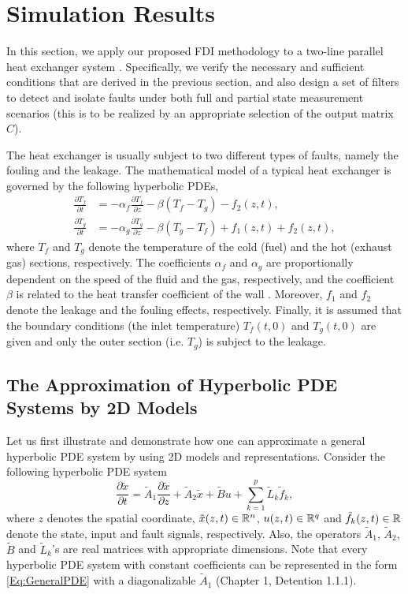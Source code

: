 \documentclass[journal,12pt,draftcls,onecolumn]{IEEEtran}
\newcommand{\pardiff}[2]{\frac{\partial {#1}}{\partial {#2}}}
\begin{document}
\section{Simulation Results}\label{Sec:Simulation}
In this section, we apply our proposed  FDI methodology to a two-line parallel heat exchanger system \cite{HyperPDE_2D,HEleakageThesis}. Specifically, we verify the necessary and sufficient conditions that are derived in the previous section, and also design a set of filters to detect and isolate  faults under both full and partial state measurement scenarios (this is to be realized by an appropriate selection of the output matrix $C$).

The heat exchanger is usually subject to two different types of faults, namely the fouling and the leakage\cite{HEleakageThesis}. 
The mathematical model of a typical heat exchanger is governed by the following hyperbolic PDEs,
\begin{equation}\label{Eq:HEfaulty}
\begin{split}
\frac{\partial T_f}{\partial t} &= -\alpha_f \frac{\partial T_f}{\partial z} - \beta(T_f - T_g) -  f_2(z,t),\\
\frac{\partial T_{g}}{\partial t} &= -\alpha_{g} \frac{\partial T_{g}}{\partial z} - \beta(T_{g} - T_f) +  f_1(z,t) +f_2(z,t),
\end{split}
\end{equation}
where $T_f$ and $T_g$ denote the temperature of the cold (fuel)  and the hot (exhaust gas) sections, respectively. The coefficients $\alpha_f$ and $\alpha_{g}$ are proportionally dependent on the speed of the fluid and the gas, respectively, and the coefficient $\beta$ is related to the heat transfer coefficient of the wall \cite{HEleakageThesis}. Moreover, $f_1$ and $f_2$ denote the leakage and the fouling effects, respectively. Finally, it is  assumed that the boundary conditions (the inlet temperature) $T_f(t,0)$ and $T_g(t,0)$ are given and only the outer section (i.e. $T_g$) is subject to the leakage.

\subsection{The Approximation of Hyperbolic PDE Systems by 2D Models}\label{Sec:PDE2FMII}
Let us first illustrate and demonstrate how one can approximate a general hyperbolic PDE system by using 2D models and representations. Consider the following hyperbolic PDE system
\begin{equation}\label{Eq:GeneralPDE}
\pardiff{\tilde{x}}{t} = \tilde{A}_1\pardiff{\tilde{x}}{z} + \tilde{A}_2\tilde{x} + \tilde{B} {u} + \sum_{k=1}^p \tilde{L}_k\tilde{f}_k,
\end{equation}
where  $z$ denotes the spatial coordinate, $\tilde{x}(z,t)\in\mathbb{R}^n$, ${u}(z,t)\in\mathbb{R}^q$  and $\tilde{f}_k(z,t)\in\mathbb{R}$ denote the state, input and fault signals, respectively. Also, the operators $\tilde{A}_1$, $\tilde{A}_2$, $\tilde{B}$ and $\tilde{L}_k$'s are real matrices with appropriate dimensions. Note that every hyperbolic PDE system with constant coefficients can be represented in the form \eqref{Eq:GeneralPDE} with a diagonalizable $\tilde{A}_1$ \cite{SiamPDEBook} (Chapter 1, Detention 1.1.1).
\end{document}
